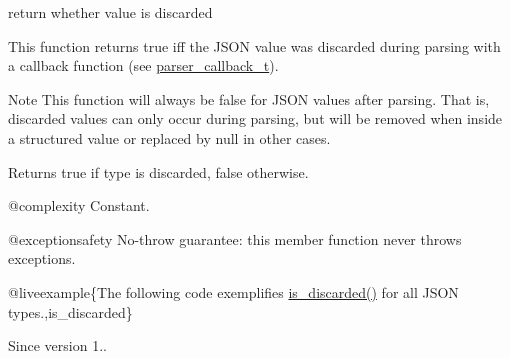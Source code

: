 return whether value is discarded 

This function returns true iff the J\+S\+ON value was discarded during parsing with a callback function (see \mbox{\hyperlink{classnlohmann_1_1basic__json_aecae491e175f8767c550ae3c59e180e3}{parser\+\_\+callback\+\_\+t}}).

\begin{DoxyNote}{Note}
This function will always be {\ttfamily false} for J\+S\+ON values after parsing. That is, discarded values can only occur during parsing, but will be removed when inside a structured value or replaced by null in other cases.
\end{DoxyNote}
\begin{DoxyReturn}{Returns}
{\ttfamily true} if type is discarded, {\ttfamily false} otherwise.
\end{DoxyReturn}
@complexity Constant.

@exceptionsafety No-\/throw guarantee\+: this member function never throws exceptions.

@liveexample\{The following code exemplifies {\ttfamily \mbox{\hyperlink{classnlohmann_1_1basic__json_aabe623bc8304c2ba92d96d91f390fab4}{is\+\_\+discarded()}}} for all J\+S\+ON types.,is\+\_\+discarded\}

\begin{DoxySince}{Since}
version 1.. 
\end{DoxySince}
\mbox{\label{classnlohmann_1_1basic__json_a8faa039ca82427ed29c486ffd00600c3}} 
